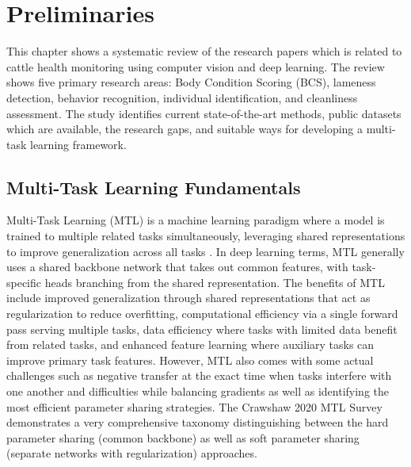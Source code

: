 \section{Preliminaries}

This chapter shows a systematic review of the research papers which is related to cattle health monitoring using computer vision and deep learning. The review shows five primary research areas: Body Condition Scoring (BCS), lameness detection, behavior recognition, individual identification, and cleanliness assessment. The study identifies current state-of-the-art methods, public datasets which are available, the research gaps, and suitable ways for developing a multi-task learning framework.

\subsection{Multi-Task Learning Fundamentals}

Multi-Task Learning (MTL) is a machine learning paradigm where a model is trained to multiple related tasks simultaneously, leveraging shared representations to improve generalization across all tasks \cite{crawshaw2020mtl}. In deep learning terms, MTL generally uses a shared backbone network that takes out common features, with task-specific heads branching from the shared representation. The benefits of MTL include improved generalization through shared representations that act as regularization to reduce overfitting, computational efficiency via a single forward pass serving multiple tasks, data efficiency where tasks with limited data benefit from related tasks, and enhanced feature learning where auxiliary tasks can improve primary task features. However, MTL also comes with some actual challenges such as negative transfer at the exact time when tasks interfere with one another and difficulties while balancing gradients as well as identifying the most efficient parameter sharing strategies. The Crawshaw 2020 MTL Survey demonstrates a very comprehensive taxonomy distinguishing between the hard parameter sharing (common backbone) as well as soft parameter sharing (separate networks with regularization) approaches.

